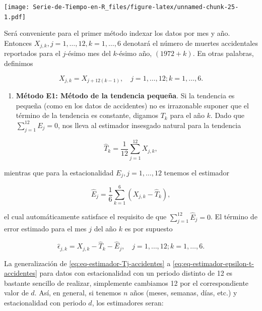\documentclass[12pt,]{krantz}
\providecommand{\tightlist}{%
  \setlength{\itemsep}{0pt}\setlength{\parskip}{0pt}}
\theoremstyle{definition}
\theoremstyle{definition}
\theoremstyle{definition}
\theoremstyle{remark}
\begin{document}
\texttt{[image: Serie-de-Tiempo-en-R\_files/figure-latex/unnamed-chunk-25-1.pdf]}

Será conveniente para el primer método indexar los datos por mes y año.
Entonces \(X_{j,k}, j=1,\ldots,12, k=1,\ldots,6\) denotará el número de
muertes accidentales reportados para el \(j\)-ésimo mes del \(k\)-ésimo
año, \((1972+k)\). En otras palabras, definimos

\[X_{j,k}=X_{j+12(k-1)},\quad j=1,\ldots,12; k=1,\ldots,6.\]

\begin{enumerate}
\def\labelenumi{\arabic{enumi})}
\tightlist
\item
  \textbf{Método E1: Método de la tendencia pequeña}. Si la tendencia es
  pequeña (como en los datos de accidentes) no es irrazonable suponer
  que el término de la tendencia es constante, digamos \(T_k\) para el
  año \(k\). Dado que \(\sum_{j=1}^{12}E_j=0\), nos lleva al estimador
  insesgado natural para la tendencia
\end{enumerate}

\begin{equation}
\hat{T}_k = \frac{1}{12}\sum_{j=1}^{12}X_{j,k},
\label{eq:eq-estimador-Tj-accidentes}
\end{equation}

mientras que para la estacionalidad \(E_j, j=1,\ldots,12\) tenemos el
estimador

\begin{equation}
\hat{E}_j = \frac{1}{6}\sum_{k=1}^6(X_{j,k}-\hat{T}_k),
\label{eq:eq-estimador-Et-accidentes}
\end{equation}

el cual automáticamente satisface el requisito de que
\(\sum_{j=1}^{12}\hat{E}_j=0\). El término de error estimado para el mes
\(j\) del año \(k\) es por supuesto

\begin{equation}
\hat{\epsilon}_{j,k} = X_{j,k}-\hat{T}_k-\hat{E}_j, \quad j=1,\ldots,12; k=1,\ldots,6.
\label{eq:eq-estimador-epsilon-t-accidentes}
\end{equation}

La generalización de \eqref{eq:eq-estimador-Tj-accidentes} a
\eqref{eq:eq-estimador-epsilon-t-accidentes} para datos con estacionalidad
con un periodo distinto de 12 es bastante sencillo de realizar,
simplemente cambiamos 12 por el correspondiente valor de \(d\). Así, en
general, si tenemos \(n\) años (meses, semanas, días, etc.) y
estacionalidad con periodo \(d\), los estimadores seran:
\end{document}
